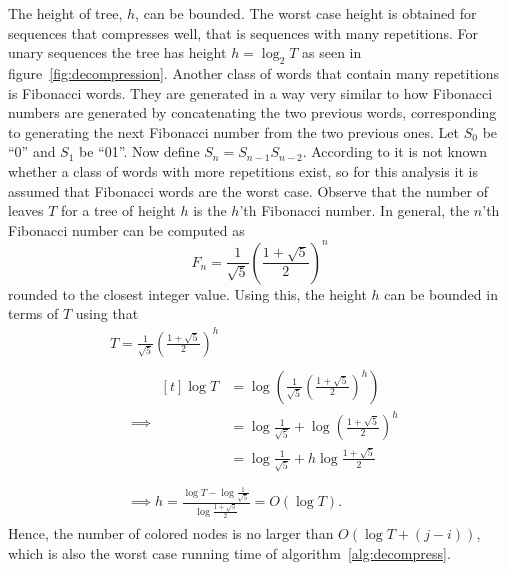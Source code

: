 \begin{enumerate}
  The height of tree, $h$, can be bounded. The worst case height is obtained
  for sequences that compresses well, that is sequences with many repetitions.
  For unary sequences the tree has height $h = \log_2 T$ as seen in
  figure~\ref{fig:decompression}. Another class of words that contain many
  repetitions is Fibonacci words. They are generated in a way very similar to
  how Fibonacci numbers are generated by concatenating the two previous words,
  corresponding to generating the next Fibonacci number from the two previous
  ones. Let $S_0$ be ``0'' and $S_1$ be ``01''. Now define
  $S_n=S_{n-1}S_{n-2}$. According to \citet{fraenkel1998many} it is not known
  whether a class of words with more repetitions exist, so for this analysis
  it is assumed that Fibonacci words are the worst case. Observe that the number of
  leaves $T$ for a tree of height $h$ is the $h$'th Fibonacci number. In
  general, the $n$'th Fibonacci number can be computed as
  \begin{equation*}
    F_n = \frac{1}{\sqrt{5}}
    {\left(
        \frac{1 + \sqrt{5}}{2}
      \right)}^n
  \end{equation*}
  rounded to the closest integer value. Using this, the height $h$ can be
  bounded in terms of $T$ using that
  \begin{gather*}
      T = \frac{1}{\sqrt{5}} {\left( \frac{1 + \sqrt{5}}{2} \right)}^h \\
      \begin{aligned}
        &\implies
        \begin{aligned}[t]
          \log T & = \log \left( \frac{1}{\sqrt{5}} {\left( \frac{1 + \sqrt{5}}{2} \right)}^h \right) \\
                 & = \log \frac{1}{\sqrt{5}} + \log {\left( \frac{1 + \sqrt{5}}{2} \right)}^h         \\
                 & = \log \frac{1}{\sqrt{5}} + h \log  \frac{1 + \sqrt{5}}{2}                         \\
        \end{aligned} \\
        &\implies h = \frac{\log T - \log \frac{1}{\sqrt{5}}}{\log \frac{1 + \sqrt{5}}{2}} = O\left(\log T\right).
      \end{aligned}
  \end{gather*}
  Hence, the number of colored nodes is no larger than $O(\log T + (j - i))$,
  which is also the worst case running time of algorithm~\ref{alg:decompress}.


\end{enumerate}
